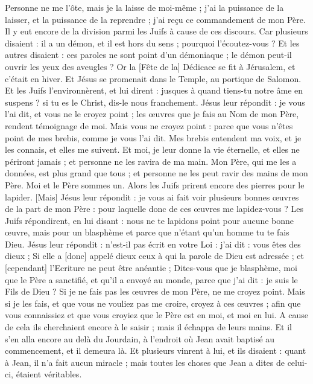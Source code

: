 \begin{multicols}{2}
Personne ne me l'ôte, mais je la laisse de moi-même ; j'ai la puissance de la laisser, et la puissance de la reprendre ; j'ai reçu ce commandement de mon Père.
Il y eut encore de la division parmi les Juifs à cause de ces discours.
Car plusieurs disaient : il a un démon, et il est hors du sens ; pourquoi l'écoutez-vous ?
Et les autres disaient : ces paroles ne sont point d'un démoniaque ; le démon peut-il ouvrir les yeux des aveugles ?
Or la [Fête de la] Dédicace se fit à Jérusalem, et c'était en hiver.
Et Jésus se promenait dans le Temple, au portique de Salomon.
Et les Juifs l'environnèrent, et lui dirent : jusques à quand tiens-tu notre âme en suspens ? si tu es le Christ, dis-le nous franchement.
Jésus leur répondit : je vous l'ai dit, et vous ne le croyez point ; les œuvres que je fais au Nom de mon Père, rendent témoignage de moi.
Mais vous ne croyez point : parce que vous n'êtes point de mes brebis, comme je vous l'ai dit.
Mes brebis entendent ma voix, et je les connais, et elles me suivent.
Et moi, je leur donne la vie éternelle, et elles ne périront jamais ; et personne ne les ravira de ma main.
Mon Père, qui me les a données, est plus grand que tous ; et personne ne les peut ravir des mains de mon Père.
Moi et le Père sommes un.
Alors les Juifs prirent encore des pierres pour le lapider.
[Mais] Jésus leur répondit : je vous ai fait voir plusieurs bonnes œuvres de la part de mon Père : pour laquelle donc de ces œuvres me lapidez-vous ?
Les Juifs répondirent, en lui disant : nous ne te lapidons point pour aucune bonne œuvre, mais pour un blasphème et parce que n'étant qu'un homme tu te fais Dieu.
Jésus leur répondit : n'est-il pas écrit en votre Loi : j'ai dit : vous êtes des dieux ;
Si elle a [donc] appelé dieux ceux à qui la parole de Dieu est adressée ; et [cependant] l'Ecriture ne peut être anéantie ;
Dites-vous que je blasphème, moi que le Père a sanctifié, et qu'il a envoyé au monde, parce que j'ai dit : je suis le Fils de Dieu ?
Si je ne fais pas les œuvres de mon Père, ne me croyez point.
Mais si je les fais, et que vous ne vouliez pas me croire, croyez à ces œuvres ; afin que vous connaissiez et que vous croyiez que le Père est en moi, et moi en lui.
A cause de cela ils cherchaient encore à le saisir ; mais il échappa de leurs mains.
Et il s'en alla encore au delà du Jourdain, à l'endroit où Jean avait baptisé au commencement, et il demeura là.
Et plusieurs vinrent à lui, et ils disaient : quant à Jean, il n'a fait aucun miracle ; mais toutes les choses que Jean a dites de celui-ci, étaient véritables.

\end{multicols}
